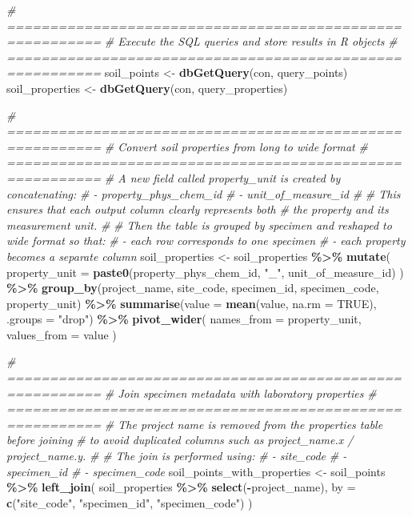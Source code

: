 \documentclass[
  10pt,
  b5paper,
  oneside]{book}
\newenvironment{Shaded}{\begin{snugshade}}{\end{snugshade}}
\newcommand{\AttributeTok}[1]{\textcolor[rgb]{0.13,0.29,0.53}{#1}}
\newcommand{\CommentTok}[1]{\textcolor[rgb]{0.56,0.35,0.01}{\textit{#1}}}
\newcommand{\ConstantTok}[1]{\textcolor[rgb]{0.56,0.35,0.01}{#1}}
\newcommand{\FunctionTok}[1]{\textcolor[rgb]{0.13,0.29,0.53}{\textbf{#1}}}
\newcommand{\NormalTok}[1]{#1}
\newcommand{\OtherTok}[1]{\textcolor[rgb]{0.56,0.35,0.01}{#1}}
\newcommand{\SpecialCharTok}[1]{\textcolor[rgb]{0.81,0.36,0.00}{\textbf{#1}}}
\newcommand{\StringTok}[1]{\textcolor[rgb]{0.31,0.60,0.02}{#1}}
\begin{document}
\begin{Shaded}
\begin{Highlighting}[]
\CommentTok{\# =========================================================}
\CommentTok{\# Execute the SQL queries and store results in R objects}
\CommentTok{\# =========================================================}
\NormalTok{soil\_points }\OtherTok{\textless{}{-}} \FunctionTok{dbGetQuery}\NormalTok{(con, query\_points)}
\NormalTok{soil\_properties }\OtherTok{\textless{}{-}} \FunctionTok{dbGetQuery}\NormalTok{(con, query\_properties)}

\CommentTok{\# =========================================================}
\CommentTok{\# Convert soil properties from long to wide format}
\CommentTok{\# =========================================================}
\CommentTok{\# A new field called \textquotesingle{}property\_unit\textquotesingle{} is created by concatenating:}
\CommentTok{\# {-} property\_phys\_chem\_id}
\CommentTok{\# {-} unit\_of\_measure\_id}
\CommentTok{\#}
\CommentTok{\# This ensures that each output column clearly represents both}
\CommentTok{\# the property and its measurement unit.}
\CommentTok{\#}
\CommentTok{\# Then the table is grouped by specimen and reshaped to wide format so that:}
\CommentTok{\# {-} each row corresponds to one specimen}
\CommentTok{\# {-} each property becomes a separate column}
\NormalTok{soil\_properties }\OtherTok{\textless{}{-}}\NormalTok{ soil\_properties }\SpecialCharTok{\%\textgreater{}\%}
  \FunctionTok{mutate}\NormalTok{(}
    \AttributeTok{property\_unit =} \FunctionTok{paste0}\NormalTok{(property\_phys\_chem\_id, }\StringTok{"\_"}\NormalTok{, unit\_of\_measure\_id)}
\NormalTok{  ) }\SpecialCharTok{\%\textgreater{}\%}
  \FunctionTok{group\_by}\NormalTok{(project\_name, site\_code, specimen\_id, specimen\_code, property\_unit) }\SpecialCharTok{\%\textgreater{}\%}
  \FunctionTok{summarise}\NormalTok{(}\AttributeTok{value =} \FunctionTok{mean}\NormalTok{(value, }\AttributeTok{na.rm =} \ConstantTok{TRUE}\NormalTok{), }\AttributeTok{.groups =} \StringTok{"drop"}\NormalTok{) }\SpecialCharTok{\%\textgreater{}\%}
  \FunctionTok{pivot\_wider}\NormalTok{(}
    \AttributeTok{names\_from =}\NormalTok{ property\_unit,}
    \AttributeTok{values\_from =}\NormalTok{ value}
\NormalTok{  )}

\CommentTok{\# =========================================================}
\CommentTok{\# Join specimen metadata with laboratory properties}
\CommentTok{\# =========================================================}
\CommentTok{\# The project name is removed from the properties table before joining}
\CommentTok{\# to avoid duplicated columns such as project\_name.x / project\_name.y.}
\CommentTok{\#}
\CommentTok{\# The join is performed using:}
\CommentTok{\# {-} site\_code}
\CommentTok{\# {-} specimen\_id}
\CommentTok{\# {-} specimen\_code}
\NormalTok{soil\_points\_with\_properties }\OtherTok{\textless{}{-}}\NormalTok{ soil\_points }\SpecialCharTok{\%\textgreater{}\%}
  \FunctionTok{left\_join}\NormalTok{(}
\NormalTok{    soil\_properties }\SpecialCharTok{\%\textgreater{}\%} \FunctionTok{select}\NormalTok{(}\SpecialCharTok{{-}}\NormalTok{project\_name),}
    \AttributeTok{by =} \FunctionTok{c}\NormalTok{(}\StringTok{"site\_code"}\NormalTok{, }\StringTok{"specimen\_id"}\NormalTok{, }\StringTok{"specimen\_code"}\NormalTok{)}
\NormalTok{  )}


\end{Highlighting}
\end{Shaded}
\end{document}
